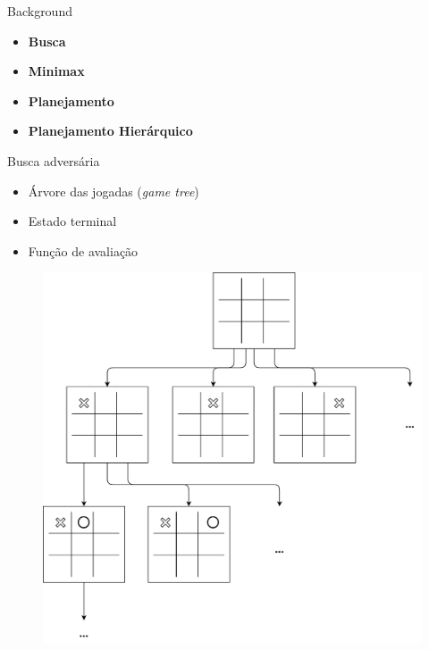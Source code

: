 \documentclass{beamer}
\begin{document}



{
	\begin{frame}{Background}
		\vspace{5mm}
		\begin{itemize}
			\item \textbf{Busca}
			\item \textbf{Minimax}
			\item \textbf{Planejamento}       		
			\item \textbf{Planejamento Hierárquico}
		\end{itemize}
	\end{frame}
}
\begin{frame}{Busca adversária}
	\begin{itemize}
		\item Árvore das jogadas (\textit{game tree})
		\item Estado terminal
		\item Função de avaliação
	\end{itemize}
	
	\begin{figure}[here]
		\includegraphics[width=0.45\linewidth]{fig/jogodavelha.pdf}	
	\end{figure}
\end{frame}
\end{document}
